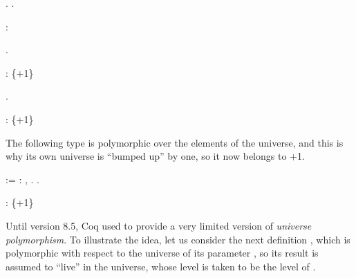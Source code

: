 

\begin{coqdoccode}
\coqdocemptyline
\coqdocnoindent
{}.\coqdoceol
\coqdocemptyline
\coqdocnoindent
{} .\coqdoceol
\coqdocemptyline
\end{coqdoccode}
\coqdoceol
\coqdocemptyline
\coqdocnoindent
{}\coqdoceol
\coqdocindent{2.50em}
: 

\coqdocemptyline
\begin{coqdoccode}
\coqdocemptyline
\coqdocnoindent
{} .\coqdoceol
\coqdocemptyline
\end{coqdoccode}
\coqdoceol
\coqdocemptyline
\coqdocnoindent
{}\coqdoceol
\coqdocindent{2.50em}
: \{+1\}

\coqdocemptyline
\begin{coqdoccode}
\coqdocemptyline
\coqdocnoindent
{} .\coqdoceol
\coqdocemptyline
\end{coqdoccode}
\coqdoceol
\coqdocemptyline
\coqdocnoindent
{}\coqdoceol
\coqdocindent{2.50em}
: \{+1\}

\coqdocemptyline


The following type is polymorphic over the elements of the 
universe, and this is why its own universe is ``bumped up'' by one, so
it now belongs to +1.


\begin{coqdoccode}
\coqdocemptyline
\coqdocnoindent
{}  := \coqdockw{\ensuremath{\forall}} : ,  .\coqdoceol
\coqdocnoindent
{} .\coqdoceol
\coqdocemptyline
\end{coqdoccode}


\coqdoceol
\coqdocemptyline
\coqdocnoindent
{}\coqdoceol
\coqdocindent{2.50em}
: \{+1\}

\coqdocemptyline




Until version 8.5, Coq used to provide a very limited version of
\textit{universe polymorphism}. To illustrate the idea, let us consider the
next definition , which is polymorphic with respect to the universe
of its parameter , so its result is assumed to ``live'' in the
universe, whose level is taken to be the level of .



